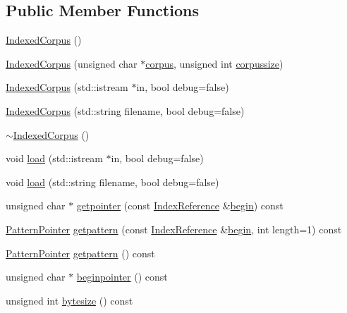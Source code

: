 \subsection*{Public Member Functions}
\begin{DoxyCompactItemize}
\item 
\hyperlink{classIndexedCorpus_abed3d107618b4d1cc91f77c56445c5a5}{Indexed\+Corpus} ()
\item 
\hyperlink{classIndexedCorpus_a90eaf21374d0bc17af480c882fcb07b2}{Indexed\+Corpus} (unsigned char $\ast$\hyperlink{classIndexedCorpus_a382d8734879b170282345a5e20e71113}{corpus}, unsigned int \hyperlink{classIndexedCorpus_aaea6690e61d8538ae86f62857f044563}{corpussize})
\item 
\hyperlink{classIndexedCorpus_a3a2369b02abd0c7f4eb25710a5aec446}{Indexed\+Corpus} (std\+::istream $\ast$in, bool debug=false)
\item 
\hyperlink{classIndexedCorpus_ab5d67abefdab495addd6bdfb976c4c0b}{Indexed\+Corpus} (std\+::string filename, bool debug=false)
\item 
\hyperlink{classIndexedCorpus_ae6bbb800f2a974b60336be7e0678ae91}{$\sim$\+Indexed\+Corpus} ()
\item 
void \hyperlink{classIndexedCorpus_af77786d6aba870b93e5cea36e25842c2}{load} (std\+::istream $\ast$in, bool debug=false)
\item 
void \hyperlink{classIndexedCorpus_a7b5292da7a8f674d83b6bc0dc5e6e3c8}{load} (std\+::string filename, bool debug=false)
\item 
unsigned char $\ast$ \hyperlink{classIndexedCorpus_a9420c42aadad6e159e00a4d42cfc08cd}{getpointer} (const \hyperlink{classIndexReference}{Index\+Reference} \&\hyperlink{classIndexedCorpus_aa8be0b3a2a730fccd755a9e12b74f869}{begin}) const 
\item 
\hyperlink{classPatternPointer}{Pattern\+Pointer} \hyperlink{classIndexedCorpus_a4f93a11280c23c7ed3d35997bb558d4b}{getpattern} (const \hyperlink{classIndexReference}{Index\+Reference} \&\hyperlink{classIndexedCorpus_aa8be0b3a2a730fccd755a9e12b74f869}{begin}, int length=1) const 
\item 
\hyperlink{classPatternPointer}{Pattern\+Pointer} \hyperlink{classIndexedCorpus_acbe113355f05b3b87819e0f713f21c14}{getpattern} () const 
\item 
unsigned char $\ast$ \hyperlink{classIndexedCorpus_ac781102b8cce6188e5c7eb9cb2c34d56}{beginpointer} () const 
\item 
unsigned int \hyperlink{classIndexedCorpus_a062ad76223ad6c7391f66207adb9f9e5}{bytesize} () const 

\end{DoxyCompactItemize}

